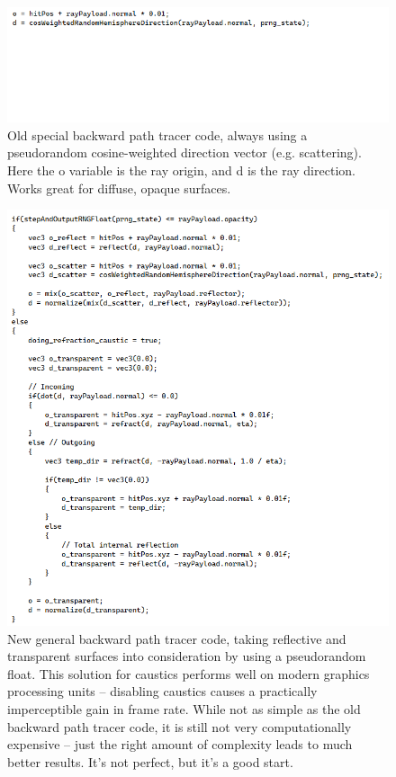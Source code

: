 \documentclass[12pt]{article}
\begin{document}
\begin{figure} 
\centering
  \includegraphics[width = 6 in]{fig3.png}
  \caption{ Old special backward path tracer code, always using a pseudorandom cosine-weighted direction vector (e.g. scattering).
Here the o variable is the ray origin, and d is the ray direction.
Works great for diffuse, opaque surfaces.
}
\end{figure}






\begin{figure} 
\centering
  \includegraphics[width = 6 in]{fig4.png}
  \caption{ New general backward path tracer code, taking reflective and transparent surfaces into consideration by using a pseudorandom float.
This solution for caustics performs well on modern graphics processing units -- disabling caustics causes a practically imperceptible gain in frame rate.
While not as simple as the old backward path tracer code, it is still not very computationally expensive -- just the right amount of complexity leads to much better results.
It's not perfect, but it's a good start.
}
\end{figure}
\end{document}

